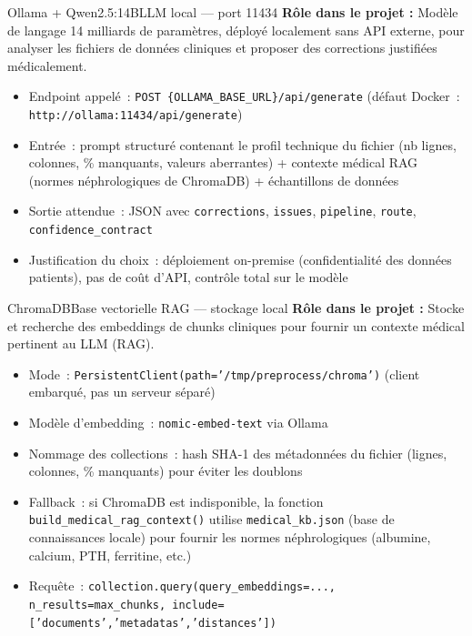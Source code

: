 \documentclass[12pt,a4paper]{article}
\begin{document}
\begin{toolbox}{Ollama + Qwen2.5:14B}{LLM local --- port 11434}
\textbf{Rôle dans le projet :} Modèle de langage 14 milliards de paramètres,
déployé localement sans API externe, pour analyser les fichiers de données
cliniques et proposer des corrections justifiées médicalement.

\begin{itemize}[leftmargin=1.5em, itemsep=2pt]
  \item Endpoint appelé~: \texttt{POST \{OLLAMA\_BASE\_URL\}/api/generate}
    (défaut Docker~: \texttt{http://ollama:11434/api/generate})
  \item Entrée~: prompt structuré contenant le profil technique du fichier
    (nb lignes, colonnes, \% manquants, valeurs aberrantes) + contexte médical
    RAG (normes néphrologiques de ChromaDB) + échantillons de données
  \item Sortie attendue~: JSON avec \texttt{corrections}, \texttt{issues},
    \texttt{pipeline}, \texttt{route}, \texttt{confidence\_contract}
  \item Justification du choix~: déploiement on-premise (confidentialité des
    données patients), pas de coût d'API, contrôle total sur le modèle
\end{itemize}
\end{toolbox}

\begin{toolbox}{ChromaDB}{Base vectorielle RAG --- stockage local}
\textbf{Rôle dans le projet :} Stocke et recherche des embeddings de chunks
cliniques pour fournir un contexte médical pertinent au LLM (RAG).

\begin{itemize}[leftmargin=1.5em, itemsep=2pt]
  \item Mode~: \texttt{PersistentClient(path='/tmp/preprocess/chroma')}
    (client embarqué, pas un serveur séparé)
  \item Modèle d'embedding~: \texttt{nomic-embed-text} via Ollama
  \item Nommage des collections~: hash SHA-1 des métadonnées du fichier
    (lignes, colonnes, \% manquants) pour éviter les doublons
  \item Fallback~: si ChromaDB est indisponible, la fonction \texttt{build\_medical\_rag\_context()} utilise
    \texttt{medical\_kb.json} (base de connaissances locale) pour fournir
    les normes néphrologiques (albumine, calcium, PTH, ferritine, etc.)
  \item Requête~: \texttt{collection.query(query\_embeddings=..., n\_results=max\_chunks,
    include=['documents','metadatas','distances'])}
\end{itemize}
\end{toolbox}
\end{document}

